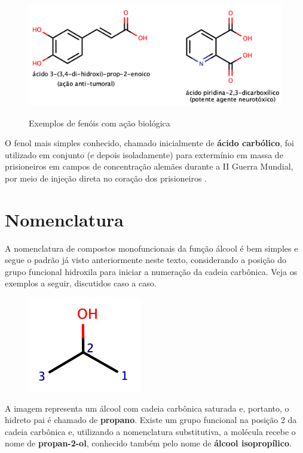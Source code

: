 \begin{figure}[ht]
    \centering
    \caption{Exemplos de fenóis com ação biológica}
    \vspace{0.5cm}
    \includegraphics[width=1\linewidth]{imagens/res.png}
\label{fig:4hexil}
\end{figure}

O fenol mais simples conhecido, chamado inicialmente de \textbf{ácido carbólico}, foi utilizado em conjunto (e depois isoladamente) para extermínio em massa de prisioneiros em campos de concentração alemães durante a II Guerra Mundial, por meio de injeção direta no coração dos prisioneiros \cite{triste}.

\section{Nomenclatura}
A nomenclatura de compostos monofuncionais da função álcool é bem simples e segue o padrão já visto anteriormente neste texto, considerando a posição do grupo funcional hidroxila para iniciar a numeração da cadeia carbônica. Veja os exemplos a seguir, discutidos caso a caso.

\begin{tcolorbox}[colback=white!5!white,colframe=orange!90!black,title=\textbf{Exemplo 1}]
	\begin{figure}[H]
		\centering
		\includegraphics[width=0.3\linewidth]{imagens/isopropanol.png}
		\label{fig:isopropanol}
	\end{figure}
	\tcblower
    A imagem representa um álcool com cadeia carbônica saturada e, portanto, o hidreto pai é chamado de \textbf{propano}. Existe um grupo funcional na posição 2 da cadeia carbônica e, utilizando a nomenclatura substitutiva, a molécula recebe o nome de \textbf{propan-2-ol}, conhecido também pelo nome de \textbf{álcool isopropílico}.
\end{tcolorbox}

